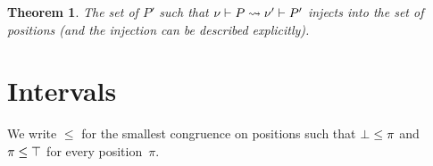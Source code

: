 \documentclass[a4paper]{article}
\theoremstyle{theorem}
\newtheorem{theorem}{Theorem}
\newtheorem{lemma}[theorem]{Lemma}
\theoremstyle{remark}
\newtheorem{remark}[theorem]{Remark}
\begin{document}




\begin{theorem}
  The set of $P'$ such that $\nu\vdash P\rightsquigarrow\nu'\vdash P'$ injects into the
  set of positions (and the injection can be described explicitly).
\end{theorem}

\section{Intervals}
We write $\leq$ for the smallest congruence on positions such that $\bot\leq\pi$ and $\pi\leq\top$ for every position~$\pi$.
\end{document}

